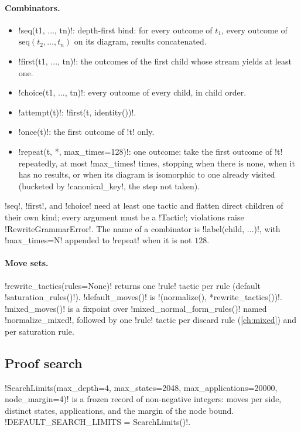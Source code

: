 \paragraph{Combinators.}
\begin{itemize}
\item \py!seq(t1, ..., tn)!: depth-first bind: for every outcome of $t_1$, every outcome of
  $\mathrm{seq}(t_2,\dots,t_n)$ on its diagram, results concatenated.
\item \py!first(t1, ..., tn)!: the outcomes of the first child whose stream yields at least one.
\item \py!choice(t1, ..., tn)!: every outcome of every child, in child order.
\item \py!attempt(t)!: \py!first(t, identity())!.
\item \py!once(t)!: the first outcome of \py!t! only.
\item \py!repeat(t, *, max_times=128)!: one outcome: take the first outcome of \py!t! repeatedly, at
  most \py!max_times! times, stopping when there is none, when it has no results, or when its diagram
  is isomorphic to one already visited (bucketed by \py!canonical_key!, the step not taken).
\end{itemize}
\py!seq!, \py!first!, and \py!choice! need at least one tactic and flatten direct children of their
own kind; every argument must be a \py!Tactic!; violations raise \py!RewriteGrammarError!. The name
of a combinator is \code!label(child, ...)!, with \code!max_times=N! appended to \code!repeat! when
it is not $128$.

\paragraph{Move sets.}
\py!rewrite_tactics(rules=None)! returns one \py!rule! tactic per rule (default
\py!saturation_rules()!). \py!default_moves()! is \py!(normalize(), *rewrite_tactics())!.
\py!mixed_moves()! is a fixpoint over \py!mixed_normal_form_rules()! named
\code!normalize_mixed!, followed by one \py!rule! tactic per discard rule (\cref{ch:mixed}) and per
saturation rule.

\subsection{Proof search}

\begin{definition}\label{def:rewriting-slimits}
\py!SearchLimits(max_depth=4, max_states=2048, max_applications=20000, node_margin=4)! is a frozen
record of non-negative integers: moves per side, distinct states, applications, and the margin of
the node bound. \py!DEFAULT_SEARCH_LIMITS = SearchLimits()!.
\end{definition}

